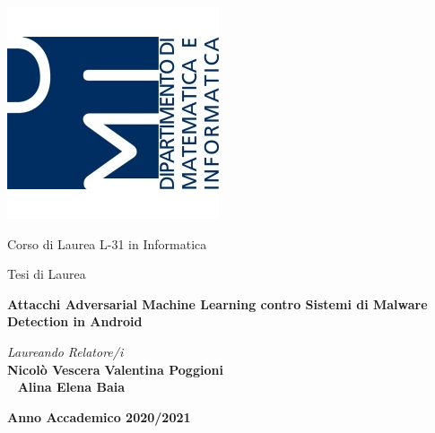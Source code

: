\begin{titlepage}
\begin{center}
\begin{minipage}[t]{0.1\textwidth}
            \includegraphics[width=\linewidth]{imgs/dmi.png}
        \end{minipage}
    
       \vspace{3cm}

       Corso di Laurea L-31 in Informatica
       
       \vspace{1.5cm}
       Tesi di Laurea
       
       \vspace{1cm}
       
        \begin{LARGE}
            \textbf{Attacchi Adversarial Machine Learning contro Sistemi di Malware Detection in Android}\par
        \end{LARGE}

       \vfill
            
       \textit{Laureando}
        \hfill
        \textit{Relatore/i} \\
        \textbf{Nicolò Vescera}
        \hfill
        \textbf{Valentina Poggioni} \\
        \ 
        \hfill
        \textbf{Alina Elena Baia}
            
        \vspace{1.5cm}
        \textbf{Anno Accademico 2020/2021}
   \end{center}
\end{titlepage}